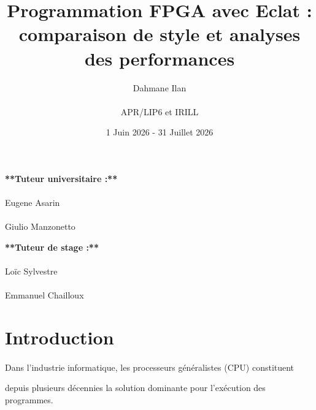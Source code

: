 \documentclass{article}
\title{Programmation FPGA avec Eclat : comparaison de style et analyses des performances}
\author {Dahmane Ilan \\\ 

APR/LIP6 et IRILL   

}
\date{1 Juin 2026 - 31 Juillet 2026}
\begin{document}
\maketitle

\vfill

\begin{center}

\begin{minipage}{0.4\textwidth}

\textbf{**Tuteur universitaire :**}\\\\

Eugene Asarin\\\\

Giulio Manzonetto

\end{minipage}

\hfill

\begin{minipage}{0.4\textwidth}

\textbf{**Tuteur de stage :**}\\\\

Loïc Sylvestre\\\\

Emmanuel Chailloux

\end{minipage}

\end{center}


\newpage

\renewcommand{\contentsname}{Sommaire}

\tableofcontents




\newpage

\section{Introduction}

\paragraph{} Dans l'industrie informatique, les processeurs généralistes (CPU) constituent 

depuis plusieurs décennies la solution dominante pour l'exécution des programmes. 
\end{document}
